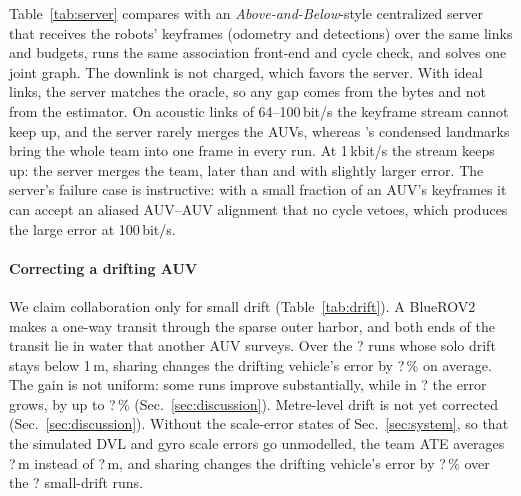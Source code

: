 Table~\ref{tab:server} compares \avatar{} with an \emph{Above-and-Below}-style centralized
server~\cite{mcconnell2026aboveandbelow} that receives the robots' keyframes (odometry and
detections) over the same links and budgets, runs the same association front-end and cycle
check, and solves one joint graph. The downlink is not charged, which favors the server.
With ideal links, the server matches the oracle, so any gap comes from the bytes and not from
the estimator. On acoustic links of 64--100\,bit/s the keyframe stream cannot keep up, and the
server rarely merges the AUVs, whereas \avatar{}'s condensed landmarks bring the whole team into
one frame in every run. At 1\,kbit/s the stream keeps up: the server merges the team, later
than \avatar{} and with slightly larger error. The server's failure case is instructive: with a small
fraction of an AUV's keyframes it can accept an aliased AUV--AUV alignment that no cycle vetoes,
which produces the large error at 100\,bit/s.

\begin{table}[t]
  \centering
  \caption{\avatar{} vs.\ a centralized server with every uplink byte counted (reference fleet,
  harbor, 600\,s, Tier-1 simulation). ``Team merged'': runs in which all four robots share one
  frame. ATE: mean $\pm$ 95\,\% CI over merged runs.}
  \label{tab:server}
  \scriptsize
  \setlength{\tabcolsep}{3pt}
\end{table}

\paragraph{Correcting a drifting AUV}
%
\providecommand{\driftSmallRuns}{?}\providecommand{\driftSmallMeanChange}{?}%
\providecommand{\driftTeamAte}{?}\providecommand{\driftNoScaleSmallRuns}{?}%
\providecommand{\driftNoScaleSmallMeanChange}{?}\providecommand{\driftNoScaleTeamAte}{?}%
\providecommand{\driftSmallWorse}{?}\providecommand{\driftSmallMaxWorse}{?}%
We claim collaboration only for small drift (Table~\ref{tab:drift}). A BlueROV2 makes a
one-way transit through the sparse outer harbor, and both ends of the transit lie in water
that another AUV surveys. Over the \driftSmallRuns{} runs whose solo drift stays below 1\,m,
sharing changes the drifting vehicle's error by \driftSmallMeanChange\,\% on average. The gain
is not uniform: some runs improve substantially, while in \driftSmallWorse{} the error grows, by
up to \driftSmallMaxWorse\,\% (Sec.~\ref{sec:discussion}). Metre-level
drift is not yet corrected (Sec.~\ref{sec:discussion}). Without the scale-error states of
Sec.~\ref{sec:system}, so that the simulated DVL and gyro scale errors go unmodelled, the
team ATE averages \driftNoScaleTeamAte\,m instead of \driftTeamAte\,m, and sharing changes
the drifting vehicle's error by \driftNoScaleSmallMeanChange\,\% over the
\driftNoScaleSmallRuns{} small-drift runs.

